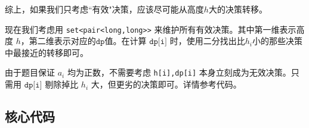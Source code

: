 综上，如果我们只考虑``有效"决策，应该尽可能从高度$h$大的决策转移。

现在我们考虑用 \texttt{set<pair<long,long>>} 来维护所有有效决策。其中第一维表示高度 $h$，第二维表示对应的$\texttt{dp}$值。在计算 $\texttt{dp[i]}$ 时，使用二分找出比$h_{i}$小的那些决策中最接近的转移即可。

由于题目保证 $a_i$ 均为正数，不需要考虑 \texttt{{h[i],dp[i]}} 本身立刻成为无效决策。只需用 $\texttt{dp[i]}$ 剔除掉比  $h_i$ 大，但更劣的决策即可。详情参考代码。





\subsection*{核心代码}
\inputminted[linenos,autogobble]{cpp}{../Code/Q.cpp}
\newpage